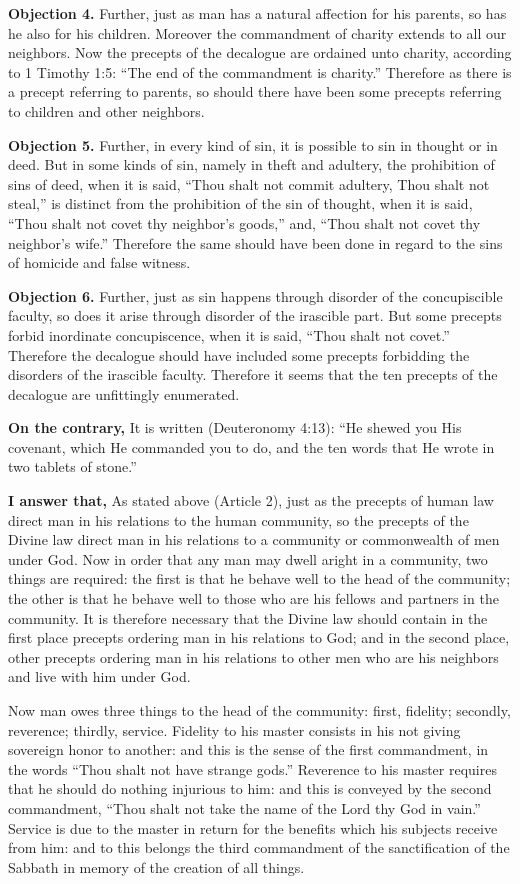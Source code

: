 \textbf{Objection 4.} Further, just as man has a natural affection for his parents, so has he also for his children. Moreover the commandment of charity extends to all our neighbors. Now the precepts of the decalogue are ordained unto charity, according to 1 Timothy 1:5: ``The end of the commandment is charity.'' Therefore as there is a precept referring to parents, so should there have been some precepts referring to children and other neighbors.

\textbf{Objection 5.} Further, in every kind of sin, it is possible to sin in thought or in deed. But in some kinds of sin, namely in theft and adultery, the prohibition of sins of deed, when it is said, ``Thou shalt not commit adultery, Thou shalt not steal,'' is distinct from the prohibition of the sin of thought, when it is said, ``Thou shalt not covet thy neighbor's goods,'' and, ``Thou shalt not covet thy neighbor's wife.'' Therefore the same should have been done in regard to the sins of homicide and false witness.

\textbf{Objection 6.} Further, just as sin happens through disorder of the concupiscible faculty, so does it arise through disorder of the irascible part. But some precepts forbid inordinate concupiscence, when it is said, ``Thou shalt not covet.'' Therefore the decalogue should have included some precepts forbidding the disorders of the irascible faculty. Therefore it seems that the ten precepts of the decalogue are unfittingly enumerated.

\textbf{On the contrary,} It is written (Deuteronomy 4:13): ``He shewed you His covenant, which He commanded you to do, and the ten words that He wrote in two tablets of stone.''

\textbf{I answer that,} As stated above (Article 2), just as the precepts of human law direct man in his relations to the human community, so the precepts of the Divine law direct man in his relations to a community or commonwealth of men under God. Now in order that any man may dwell aright in a community, two things are required: the first is that he behave well to the head of the community; the other is that he behave well to those who are his fellows and partners in the community. It is therefore necessary that the Divine law should contain in the first place precepts ordering man in his relations to God; and in the second place, other precepts ordering man in his relations to other men who are his neighbors and live with him under God.

Now man owes three things to the head of the community: first, fidelity; secondly, reverence; thirdly, service. Fidelity to his master consists in his not giving sovereign honor to another: and this is the sense of the first commandment, in the words ``Thou shalt not have strange gods.'' Reverence to his master requires that he should do nothing injurious to him: and this is conveyed by the second commandment, ``Thou shalt not take the name of the Lord thy God in vain.'' Service is due to the master in return for the benefits which his subjects receive from him: and to this belongs the third commandment of the sanctification of the Sabbath in memory of the creation of all things.

